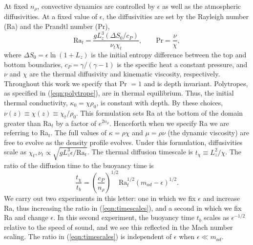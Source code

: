 \documentclass[aps, prl, twocolumn, nofootinbib, groupedaddress, amsfonts, amssymb, amsmath]{revtex4-1}
\begin{document}
At fixed $n_\rho$, convective dynamics are 
controlled by $\epsilon$ as well as the atmospheric diffusivities.
At a fixed value of
$\epsilon$, the diffusivities are set by the
Rayleigh number (Ra) and the Prandtl number (Pr),
\begin{equation}
\text{Ra}_{t} = \frac{g L_z^3 (\Delta S_0 / c_P)}{\nu_t\chi_t},
\qquad
\text{Pr} = \frac{\nu}{\chi},
\end{equation}
where $\Delta S_0 = \epsilon\ln (1 + L_z)$ is the initial entropy
difference between the top and bottom boundaries,
$c_P = \gamma/(\gamma-1)$ is the specific heat a
constant pressure, and $\nu$ and $\chi$ are the thermal diffusivity and
kinematic viscosity, respectively.
Throughout this work we specify
that Pr $= 1$ and is depth invariant.
Polytropes, as specified in (\ref{eqn:polytrope}),
are in thermal equilibrium. Thus, the initial thermal
conductivity, $\kappa_0 = \chi \rho_0$, is
constant with depth. 
By these
choices, $\nu(z) \equiv \chi(z) \equiv \chi_t / \rho_0$.
This formulation 
sets Ra at the bottom of the domain greater than
Ra$_t$ by a factor of $e^{2n_\rho}$. Henceforth
when we specify Ra we are referring to Ra$_t$.  
The full values of $\kappa = \rho\chi$ and 
$\mu = \rho\nu$ (the dynamic viscosity) are free to evolve as the density 
profile evolves.  
Under this formulation, diffusivities scale as
$\chi_t, \nu_t \propto \sqrt{g L_z^3 \epsilon / \text{Ra}_t}$.
The thermal diffusion timescale is $t_\chi \equiv L_z^2 / \chi$. The
ratio of the diffusion time to the buoyancy time is
\begin{equation}
\frac{t_\chi}{t_b} = \left(\frac{c_P}{n_\rho}\right)^{1/2}\text{Ra}_t^{1/2}
\left(m_{ad} - \epsilon\right)^{1/2}.
\label{eqn:timescales}
\end{equation}
We carry out two experiments in this letter: one in which
we fix $\epsilon$ and increase Ra, thus increasing the ratio in
(\ref{eqn:timescales}), and a second in which we fix Ra and change $\epsilon$.
In this second experiment, the buoyancy time $t_b$ scales as $\epsilon^{-1/2}$
relative to the speed of sound, and we see this reflected in the Mach
number scaling. The ratio in (\ref{eqn:timescales}) is
independent of $\epsilon$ when $\epsilon \ll m_{ad}$.
\end{document}
